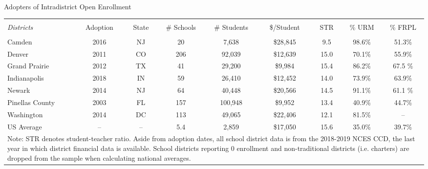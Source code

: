 \documentclass[notes,11pt, aspectratio=169]{beamer}
\begin{document}
\begin{frame}{Adopters of Intradistrict Open Enrollment}
\label{sumstats}
\begin{table}[h] \centering 
\renewcommand{\arraystretch}{1.25}
    \label{sumstats} 
  \scriptsize 
  \begin{tabular}{@{\extracolsep{5pt}}lcccccccc} 
  \\[-1.8ex]\hline 
  \hline \\[-1.8ex] 
  \textit{Districts} & Adoption & State & \# Schools & \# Students & \$/Student & STR & \% URM & \% FRPL \\ 
  \hline \\[-1.8ex] 
  Camden & 2016 & NJ & 20 & 7,638 & \$28,845 & 9.5 & 98.6\% & 51.3\% \\
  Denver & 2011 & CO & 206 & 92,039 & \$12,639 & 15.0 & 70.1\% & 55.9\% \\
  Grand Prairie & 2012 & TX & 41 & 29,200 & \$9,984 & 15.4 & 86.2\% & 67.5 \% \\
  Indianapolis & 2018 & IN & 59 & 26,410 & \$12,452 & 14.0 & 73.9\% & 63.9\% \\ 
  Newark & 2014 & NJ & 64 & 40,448 & \$20,566 & 14.5 & 91.1\% & 61.1 \% \\  
  Pinellas County & 2003 & FL & 157 & 100,948 & \$9,952 & 13.4 & 40.9\% & 44.7\% \\  
  Washington & 2014 & DC & 113 & 49,065 & \$22,406 & 12.1 & 81.5\% & -- \\  
  \midrule
  US Average & -- & -- & 5.4 & 2,859 & \$17,050 & 15.6 & 35.0\% & 39.7\% \\  
  \midrule \midrule
  \multicolumn{9}{l}{\parbox{15cm}{Note: STR denotes student-teacher ratio. Aside from adoption dates, all school district data is from the 2018-2019 NCES CCD, the last year in which district financial data is available. School districts reporting 0 enrollment and non-traditional districts (i.e. charters) are dropped from the sample when calculating national averages.}}
  \end{tabular}
  \end{table} 
  \hyperlink{giniback}{}
\end{frame}
\end{document}
